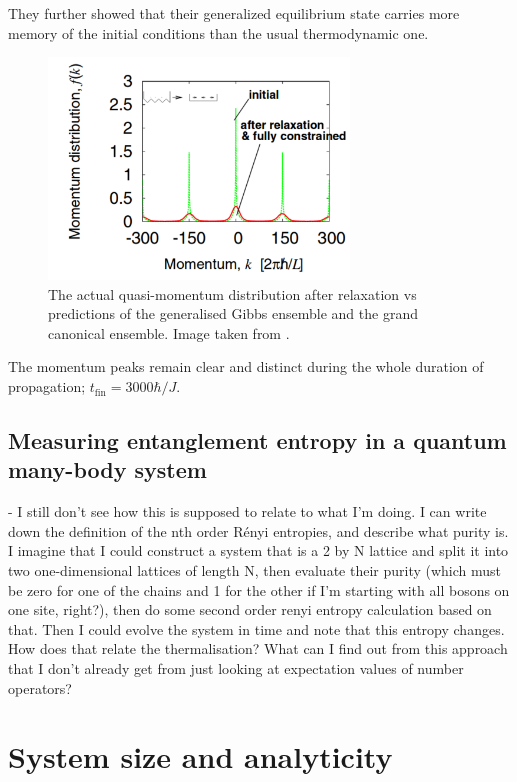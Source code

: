\documentclass[a4paper,10pt]{article}
\theoremstyle{plain}
\begin{document}
They further showed that their generalized equilibrium state carries more memory of the initial conditions than the usual thermodynamic one.

\begin{figure}[H]
 \begin{center}
 \includegraphics[width=8cm]{after_relaxation_rigol}
 \end{center}
 \caption{The actual quasi-momentum distribution after relaxation vs predictions of the generalised Gibbs ensemble and the grand canonical ensemble. Image taken from \cite{Rigol2007}.}
 \end{figure}

The momentum peaks remain clear and distinct during the whole duration  of  propagation; $t_{\text{fin}}=3000\hbar/J$.

\subsection{Measuring entanglement entropy in a quantum many-body system}
- I still don't see how this is supposed to relate to what I'm doing.
I can write down the definition of the nth order R\'enyi entropies, and describe what purity is.
I imagine that I could construct a system that is a 2 by N lattice and split it into two one-dimensional lattices of length N, then evaluate their purity (which must be zero for one of the
chains and 1 for the other if I'm starting with all bosons on one site, right?), then do some second order renyi entropy calculation based on that. Then I could evolve the system in time
and note that this entropy changes. How does that relate the thermalisation? What can I find out from this approach that I don't already get from just looking at expectation values of number
operators?

\newpage

\section{System size and analyticity}
\end{document}
